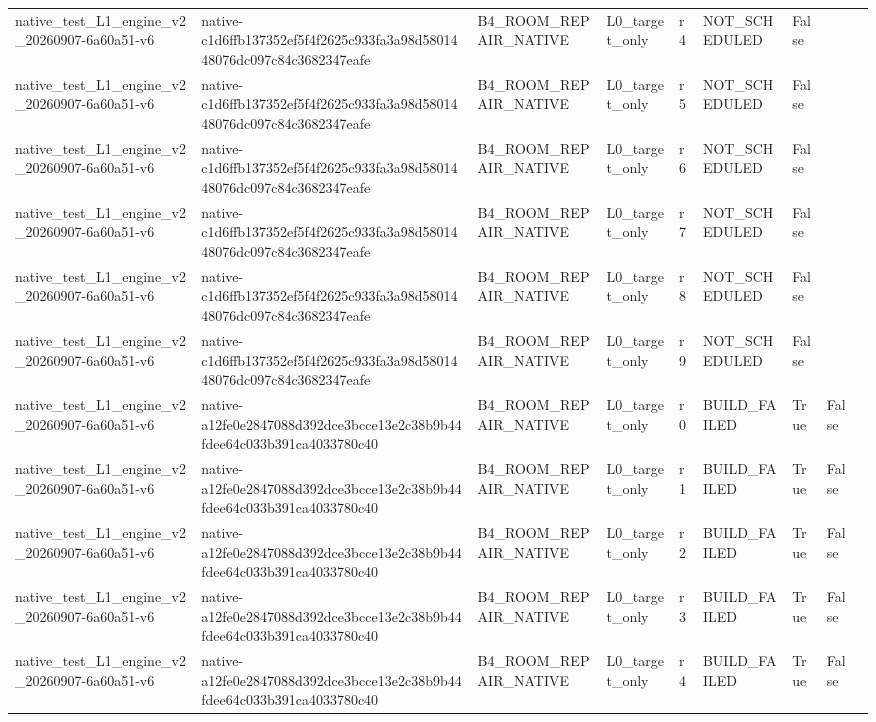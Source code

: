 \begin{tabular}{lllllllll}
native\_test\_L1\_engine\_v2\_20260907-6a60a51-v6 & native-c1d6ffb137352ef5f4f2625c933fa3a98d5801448076dc097c84c3682347eafe & B4\_ROOM\_REPAIR\_NATIVE & L0\_target\_only & r4 & NOT\_SCHEDULED & False &  &  \\
native\_test\_L1\_engine\_v2\_20260907-6a60a51-v6 & native-c1d6ffb137352ef5f4f2625c933fa3a98d5801448076dc097c84c3682347eafe & B4\_ROOM\_REPAIR\_NATIVE & L0\_target\_only & r5 & NOT\_SCHEDULED & False &  &  \\
native\_test\_L1\_engine\_v2\_20260907-6a60a51-v6 & native-c1d6ffb137352ef5f4f2625c933fa3a98d5801448076dc097c84c3682347eafe & B4\_ROOM\_REPAIR\_NATIVE & L0\_target\_only & r6 & NOT\_SCHEDULED & False &  &  \\
native\_test\_L1\_engine\_v2\_20260907-6a60a51-v6 & native-c1d6ffb137352ef5f4f2625c933fa3a98d5801448076dc097c84c3682347eafe & B4\_ROOM\_REPAIR\_NATIVE & L0\_target\_only & r7 & NOT\_SCHEDULED & False &  &  \\
native\_test\_L1\_engine\_v2\_20260907-6a60a51-v6 & native-c1d6ffb137352ef5f4f2625c933fa3a98d5801448076dc097c84c3682347eafe & B4\_ROOM\_REPAIR\_NATIVE & L0\_target\_only & r8 & NOT\_SCHEDULED & False &  &  \\
native\_test\_L1\_engine\_v2\_20260907-6a60a51-v6 & native-c1d6ffb137352ef5f4f2625c933fa3a98d5801448076dc097c84c3682347eafe & B4\_ROOM\_REPAIR\_NATIVE & L0\_target\_only & r9 & NOT\_SCHEDULED & False &  &  \\
native\_test\_L1\_engine\_v2\_20260907-6a60a51-v6 & native-a12fe0e2847088d392dce3bcce13e2c38b9b44fdee64c033b391ca4033780c40 & B4\_ROOM\_REPAIR\_NATIVE & L0\_target\_only & r0 & BUILD\_FAILED & True & False &  \\
native\_test\_L1\_engine\_v2\_20260907-6a60a51-v6 & native-a12fe0e2847088d392dce3bcce13e2c38b9b44fdee64c033b391ca4033780c40 & B4\_ROOM\_REPAIR\_NATIVE & L0\_target\_only & r1 & BUILD\_FAILED & True & False &  \\
native\_test\_L1\_engine\_v2\_20260907-6a60a51-v6 & native-a12fe0e2847088d392dce3bcce13e2c38b9b44fdee64c033b391ca4033780c40 & B4\_ROOM\_REPAIR\_NATIVE & L0\_target\_only & r2 & BUILD\_FAILED & True & False &  \\
native\_test\_L1\_engine\_v2\_20260907-6a60a51-v6 & native-a12fe0e2847088d392dce3bcce13e2c38b9b44fdee64c033b391ca4033780c40 & B4\_ROOM\_REPAIR\_NATIVE & L0\_target\_only & r3 & BUILD\_FAILED & True & False &  \\
native\_test\_L1\_engine\_v2\_20260907-6a60a51-v6 & native-a12fe0e2847088d392dce3bcce13e2c38b9b44fdee64c033b391ca4033780c40 & B4\_ROOM\_REPAIR\_NATIVE & L0\_target\_only & r4 & BUILD\_FAILED & True & False &  \\

\end{tabular}
